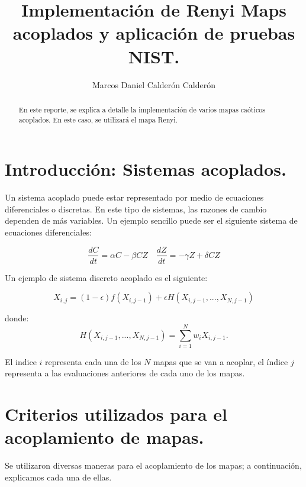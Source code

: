 \documentclass[12pt,3p]{elsarticle}
\begin{document}
\begin{frontmatter}

\title{Implementación de Renyi Maps acoplados y aplicación de pruebas NIST.}



\author{Marcos Daniel Calderón Calderón}







\begin{abstract}
En este reporte, se explica a detalle la implementación de varios mapas caóticos acoplados. En este caso, se utilizará el mapa Renyi. 
\end{abstract}



\end{frontmatter}

\section{Introducción: Sistemas acoplados.}

Un sistema acoplado puede estar representado por medio de ecuaciones diferenciales o discretas. En este tipo de sistemas, las razones de cambio dependen de más variables. Un ejemplo sencillo puede ser el siguiente sistema de ecuaciones diferenciales:

\begin{equation}
\frac{dC}{dt}= \alpha C - \beta CZ \quad
\frac{dZ}{dt}= - \gamma Z + \delta CZ
\end{equation}

Un ejemplo de sistema discreto acoplado es el siguiente:

\begin{equation}
X_{i,j}= (1 -\epsilon )f(X_{i,j-1})+ \epsilon H(X_{i,j-1},...,X_{N,j-1})
\end{equation}

donde:
\begin{equation}
H(X_{i,j-1},...,X_{N,j-1}) = \sum_{i=1}^{N}w_{i}X_{i,j-1}.
\end{equation}

El indice $i$ representa cada una de los $N$ mapas que se van a acoplar, el índice $j$ representa a   las evaluaciones anteriores de cada uno de los mapas.

\section{Criterios utilizados para el acoplamiento de mapas.}
Se utilizaron diversas maneras para el acoplamiento de los mapas; a continuación, explicamos cada una de ellas.
\end{document}
